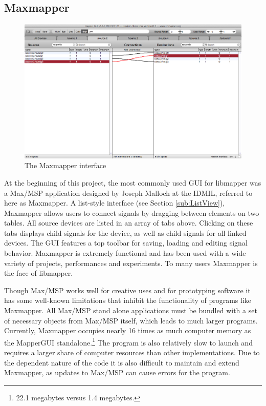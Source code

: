 	\subsection{Maxmapper} %
	\label{sub:maxmapper}

\begin{figure}[ht]
	\centering
	\includegraphics[width=\textwidth]{figures/maxmapper}
	\caption{The Maxmapper interface}
	\label{fig:maxmapper}
\end{figure}

At the beginning of this project, the most commonly used GUI for libmapper was a Max/MSP application designed by Joseph Malloch at the IDMIL, referred to here as Maxmapper. A list-style interface (see Section \ref{sub:ListView}), Maxmapper allows users to connect signals by dragging between elements on two tables. All source devices are listed in an array of tabs above. Clicking on these tabs displays child signals for the device, as well as child signals for all linked devices. The GUI features a top toolbar for saving, loading and editing signal behavior. Maxmapper is extremely functional and has been used with a wide variety of projects, performances and experiments. To many users Maxmapper is the face of libmapper.
	
Though Max/MSP works well for creative uses and for prototyping software it has some well-known limitations that inhibit the functionality of programs like Maxmapper. All Max/MSP stand alone applications must be bundled with a set of necessary objects from Max/MSP itself, which leads to much larger programs. Currently, Maxmapper occupies nearly 16 times as much computer memory as the MapperGUI standalone.\footnote{22.1 megabytes versus 1.4 megabytes.} The program is also relatively slow to launch and requires a larger share of computer resources than other implementations. Due to the dependent nature of the code it is also difficult to maintain and extend Maxmapper, as updates to Max/MSP can cause errors for the program.

